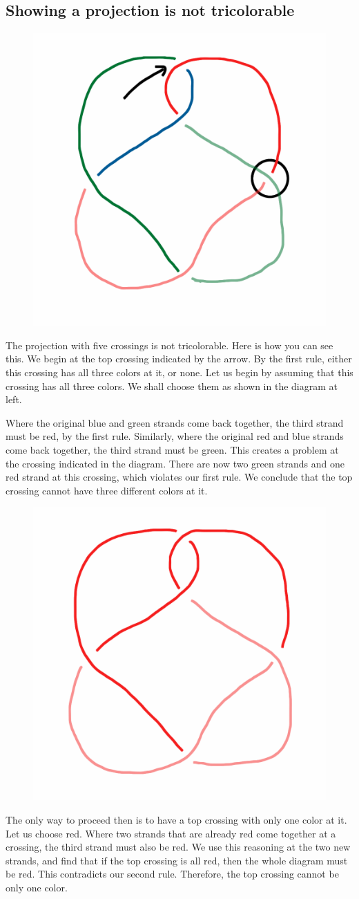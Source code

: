 \documentclass[12pt,letterpaper]{article}
\theoremstyle{definition}
\begin{document}
\subsection*{Showing a projection is not tricolorable}

\begin{figure}
    \centering
    \includegraphics[width=.3\textwidth]{knotpics/nocolor1.png}
\end{figure}
The projection with five crossings is not tricolorable.
Here is how you can see this. 
We begin at the top crossing indicated by the arrow. 
By the first rule, either this crossing has all three colors at it, or none.
Let us begin by assuming that this crossing has all three colors.
We shall choose them as shown in the diagram at left.


Where the original blue and green strands come back together, the third strand must be red, by the first rule.
Similarly, where the original red and blue strands come back together, the third strand must be green.
This creates a problem at the crossing indicated in the diagram.
There are now two green strands and one red strand at this crossing, which violates our first rule. We conclude that the top crossing cannot have three different colors at it.

\begin{figure}
    \centering
    \includegraphics[width=.3\textwidth]{knotpics/nocolor2.png}
\end{figure}
The only way to proceed then is to have a top crossing with only one color at it.
Let us choose red.
Where two strands that are already red come together at a crossing, the third strand must also be red.
We use this reasoning at the two new strands, and find that if the top crossing is all red, then the whole diagram must be red. 
This contradicts our second rule. 
Therefore, the top crossing cannot be only one color.
\end{document}
